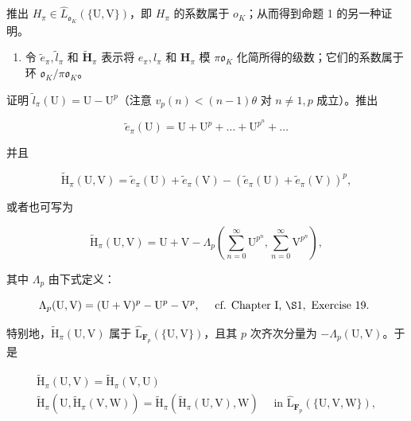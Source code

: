 推出 \(H_{\pi} \in \hat{L}_{\mathfrak{o}_{K}}(\{\mathrm{U}, \mathrm{V}\})\)，即 \(H_{\pi}\) 的系数属于 \(o_{K}\)；从而得到命题 1 的另一种证明。

\begin{enumerate}
\def\labelenumi{(\alph{enumi})}
\setcounter{enumi}{3}
\tightlist
\item
  令 \(\tilde{e}_{\pi}, \tilde{l}_{\pi}\) 和 \(\tilde{\mathbf{H}}_{\pi}\) 表示将 \(e_{\pi}, l_{\pi}\) 和 \(\mathbf{H}_{\pi}\) 模 \(\pi \mathfrak{o}_{K}\) 化简所得的级数；它们的系数属于环 \(\mathfrak{o}_{K} / \pi \mathfrak{o}_{K}\)。
\end{enumerate}

证明 \(\tilde{l}_{\pi}(\mathrm{U}) = \mathrm{U} - \mathrm{U}^{p}\)（注意 \(v_{p}(n) < (n - 1)\theta\) 对 \(n \neq 1, p\) 成立）。推出

\[
\tilde {e} _ {\pi} (\mathrm{U}) = \mathrm{U} + \mathrm{U} ^ {p} + \dots + \mathrm{U} ^ {p ^ {n}} + \dots
\]

并且

\[
\tilde {\mathrm{H}} _ {\pi} (\mathrm{U}, \mathrm{V}) = \tilde {e} _ {\pi} (\mathrm{U}) + \tilde {e} _ {\pi} (\mathrm{V}) - (\tilde {e} _ {\pi} (\mathrm{U}) + \tilde {e} _ {\pi} (\mathrm{V})) ^ {p},
\]

或者也可写为

\[
\tilde {\mathrm{H}} _ {\pi} (\mathrm{U}, \mathrm{V}) = \mathrm{U} + \mathrm{V} - \Lambda_ {p} \left(\sum_ {n = 0} ^ {\infty} \mathrm{U} ^ {p ^ {n}}, \sum_ {n = 0} ^ {\infty} \mathrm{V} ^ {p ^ {n}}\right),
\]

其中 \(\Lambda_{p}\) 由下式定义：

\[
\Lambda_ {p} (\mathrm{U}, \mathrm{V}) = (\mathrm{U} + \mathrm{V}) ^ {p} - \mathrm{U} ^ {p} - \mathrm{V} ^ {p}, \quad \text { cf.   Chapter   I,   } \S 1, \text {   Exercise   19. }
\]

特别地，\(\tilde{\mathrm{H}}_{\pi}(\mathrm{U},\mathrm{V})\) 属于 \(\hat{\mathrm{L}}_{\mathbf{F}_{p}}(\{\mathrm{U},\mathrm{V}\})\)，且其 \(p\) 次齐次分量为 \(-\Lambda_p(\mathrm{U},\mathrm{V})\)。于是

\[
\begin{array}{c} \tilde {\mathrm{H}} _ {\pi} (\mathrm{U}, \mathrm{V}) = \tilde {\mathrm{H}} _ {\pi} (\mathrm{V}, \mathrm{U}) \\ \tilde {\mathrm{H}} _ {\pi} (\mathrm{U}, \tilde {\mathrm{H}} _ {\pi} (\mathrm{V}, \mathrm{W})) = \tilde {\mathrm{H}} _ {\pi} (\tilde {\mathrm{H}} _ {\pi} (\mathrm{U}, \mathrm{V}), \mathrm{W}) \quad \text { in } \hat {\mathrm{L}} _ {\mathbf {F} _ {p}} (\{\mathrm{U}, \mathrm{V}, \mathrm{W} \}), \end{array}
\]

